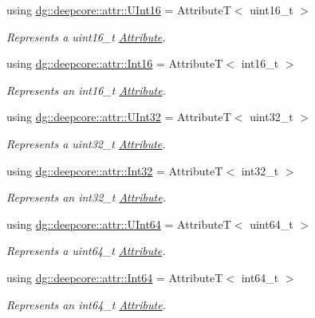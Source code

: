 \begin{DoxyCompactItemize}
using \hyperlink{group___process_attributes_ga1d4f77318c9b5cbb83ca3a9983c58829}{dg\+::deepcore\+::attr\+::\+U\+Int16} = AttributeT$<$ uint16\+\_\+t $>$
\begin{DoxyCompactList}\small\item\em Represents a {\ttfamily uint16\+\_\+t} \hyperlink{classdg_1_1deepcore_1_1_attribute}{Attribute}. \end{DoxyCompactList}\item 
using \hyperlink{group___process_attributes_gac2aeb0ab4afb8e7b231b95d178940f57}{dg\+::deepcore\+::attr\+::\+Int16} = AttributeT$<$ int16\+\_\+t $>$
\begin{DoxyCompactList}\small\item\em Represents an {\ttfamily int16\+\_\+t} \hyperlink{classdg_1_1deepcore_1_1_attribute}{Attribute}. \end{DoxyCompactList}\item 
using \hyperlink{group___process_attributes_ga685518764bcfc2ffb146ef7eb5882b3b}{dg\+::deepcore\+::attr\+::\+U\+Int32} = AttributeT$<$ uint32\+\_\+t $>$
\begin{DoxyCompactList}\small\item\em Represents a {\ttfamily uint32\+\_\+t} \hyperlink{classdg_1_1deepcore_1_1_attribute}{Attribute}. \end{DoxyCompactList}\item 
using \hyperlink{group___process_attributes_ga2c454952beddca2ef5ee37964bf022a7}{dg\+::deepcore\+::attr\+::\+Int32} = AttributeT$<$ int32\+\_\+t $>$
\begin{DoxyCompactList}\small\item\em Represents an {\ttfamily int32\+\_\+t} \hyperlink{classdg_1_1deepcore_1_1_attribute}{Attribute}. \end{DoxyCompactList}\item 
using \hyperlink{group___process_attributes_gad89c97a988d87ed15cbb54d25ea8fd97}{dg\+::deepcore\+::attr\+::\+U\+Int64} = AttributeT$<$ uint64\+\_\+t $>$
\begin{DoxyCompactList}\small\item\em Represents a {\ttfamily uint64\+\_\+t} \hyperlink{classdg_1_1deepcore_1_1_attribute}{Attribute}. \end{DoxyCompactList}\item 
using \hyperlink{group___process_attributes_gacab5ef809f8f2f471dfe6e40eaf1b36f}{dg\+::deepcore\+::attr\+::\+Int64} = AttributeT$<$ int64\+\_\+t $>$
\begin{DoxyCompactList}\small\item\em Represents an {\ttfamily int64\+\_\+t} \hyperlink{classdg_1_1deepcore_1_1_attribute}{Attribute}. \end{DoxyCompactList}\item 

\end{DoxyCompactItemize}
